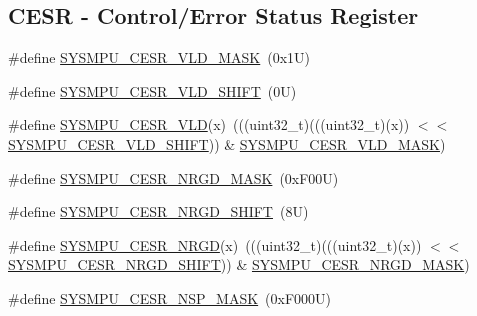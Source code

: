 \subsection*{C\+E\+SR -\/ Control/\+Error Status Register}
\begin{DoxyCompactItemize}
\item 
\#define \mbox{\hyperlink{group___s_y_s_m_p_u___register___masks_ga259df00a0bc876323990972e64a9c7e7}{S\+Y\+S\+M\+P\+U\+\_\+\+C\+E\+S\+R\+\_\+\+V\+L\+D\+\_\+\+M\+A\+SK}}~(0x1\+U)
\item 
\#define \mbox{\hyperlink{group___s_y_s_m_p_u___register___masks_ga2421b268cb5e1ac79a30eb7cc66e17e3}{S\+Y\+S\+M\+P\+U\+\_\+\+C\+E\+S\+R\+\_\+\+V\+L\+D\+\_\+\+S\+H\+I\+FT}}~(0\+U)
\item 
\#define \mbox{\hyperlink{group___s_y_s_m_p_u___register___masks_ga00f4c8510a02b5acd409f51ffc26de85}{S\+Y\+S\+M\+P\+U\+\_\+\+C\+E\+S\+R\+\_\+\+V\+LD}}(x)~(((uint32\+\_\+t)(((uint32\+\_\+t)(x)) $<$$<$ \mbox{\hyperlink{group___s_y_s_m_p_u___register___masks_ga2421b268cb5e1ac79a30eb7cc66e17e3}{S\+Y\+S\+M\+P\+U\+\_\+\+C\+E\+S\+R\+\_\+\+V\+L\+D\+\_\+\+S\+H\+I\+FT}})) \& \mbox{\hyperlink{group___s_y_s_m_p_u___register___masks_ga259df00a0bc876323990972e64a9c7e7}{S\+Y\+S\+M\+P\+U\+\_\+\+C\+E\+S\+R\+\_\+\+V\+L\+D\+\_\+\+M\+A\+SK}})
\item 
\#define \mbox{\hyperlink{group___s_y_s_m_p_u___register___masks_gaaf6c8f0664a073b376e646c9c4e24952}{S\+Y\+S\+M\+P\+U\+\_\+\+C\+E\+S\+R\+\_\+\+N\+R\+G\+D\+\_\+\+M\+A\+SK}}~(0x\+F00\+U)
\item 
\#define \mbox{\hyperlink{group___s_y_s_m_p_u___register___masks_ga17df488654b4d09a0a15c02acc6f4de5}{S\+Y\+S\+M\+P\+U\+\_\+\+C\+E\+S\+R\+\_\+\+N\+R\+G\+D\+\_\+\+S\+H\+I\+FT}}~(8\+U)
\item 
\#define \mbox{\hyperlink{group___s_y_s_m_p_u___register___masks_gaf7a17c9bff832202cee487ff5cd304e8}{S\+Y\+S\+M\+P\+U\+\_\+\+C\+E\+S\+R\+\_\+\+N\+R\+GD}}(x)~(((uint32\+\_\+t)(((uint32\+\_\+t)(x)) $<$$<$ \mbox{\hyperlink{group___s_y_s_m_p_u___register___masks_ga17df488654b4d09a0a15c02acc6f4de5}{S\+Y\+S\+M\+P\+U\+\_\+\+C\+E\+S\+R\+\_\+\+N\+R\+G\+D\+\_\+\+S\+H\+I\+FT}})) \& \mbox{\hyperlink{group___s_y_s_m_p_u___register___masks_gaaf6c8f0664a073b376e646c9c4e24952}{S\+Y\+S\+M\+P\+U\+\_\+\+C\+E\+S\+R\+\_\+\+N\+R\+G\+D\+\_\+\+M\+A\+SK}})
\item 
\#define \mbox{\hyperlink{group___s_y_s_m_p_u___register___masks_gac48f7411bae4206428ca7a27f95fe89b}{S\+Y\+S\+M\+P\+U\+\_\+\+C\+E\+S\+R\+\_\+\+N\+S\+P\+\_\+\+M\+A\+SK}}~(0x\+F000\+U)
\item 

\end{DoxyCompactItemize}
